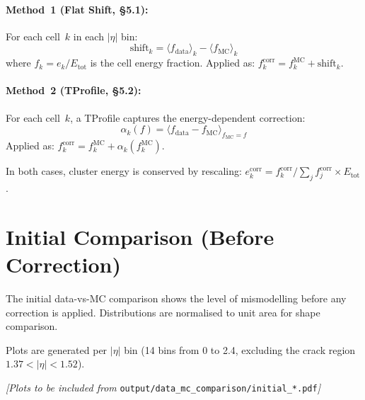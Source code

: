 \documentclass[a4paper,11pt]{article}
\begin{document}
\paragraph{Method~1 (Flat Shift, \S5.1):}
For each cell~$k$ in each $|\eta|$ bin:
\begin{equation}
  \text{shift}_k = \langle f_{\text{data}} \rangle_k - \langle f_{\text{MC}} \rangle_k
\end{equation}
where $f_k = e_k / E_{\text{tot}}$ is the cell energy fraction. Applied as:
$f_k^{\text{corr}} = f_k^{\text{MC}} + \text{shift}_k$.

\paragraph{Method~2 (TProfile, \S5.2):}
For each cell~$k$, a TProfile captures the energy-dependent correction:
\begin{equation}
  \alpha_k(f) = \langle f_{\text{data}} - f_{\text{MC}} \rangle_{f_{\text{MC}} = f}
\end{equation}
Applied as: $f_k^{\text{corr}} = f_k^{\text{MC}} + \alpha_k(f_k^{\text{MC}})$.

In both cases, cluster energy is conserved by rescaling:
$e_k^{\text{corr}} = f_k^{\text{corr}} / \sum_j f_j^{\text{corr}} \times E_{\text{tot}}$.

\section{Initial Comparison (Before Correction)}

The initial data-vs-MC comparison shows the level of mismodelling before
any correction is applied. Distributions are normalised to unit area for
shape comparison.

Plots are generated per $|\eta|$ bin (14 bins from 0 to 2.4, excluding
the crack region $1.37 < |\eta| < 1.52$).

\textit{[Plots to be included from} \texttt{output/data\_mc\_comparison/initial\_*.pdf}\textit{]}

\end{document}
